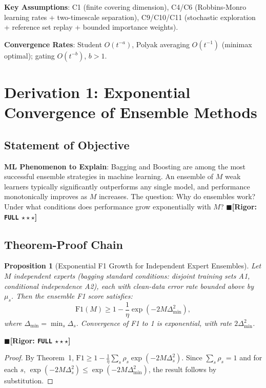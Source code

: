 \documentclass[12pt,a4paper]{article}
\newtheorem{proposition}[theorem]{Proposition}
\theoremstyle{definition}
\theoremstyle{remark}
\newcommand{\rigorFull}{$\blacksquare$\;\textbf{[Rigor: \texttt{FULL} $\star\star\star$]}}
\begin{document}
\noindent\textbf{Key Assumptions}: C1 (finite covering dimension), C4/C6 (Robbins-Monro learning rates + two-timescale separation), C9/C10/C11 (stochastic exploration + reference set replay + bounded importance weights).

\noindent\textbf{Convergence Rates}: Student $O(t^{-a})$, Polyak averaging $O(t^{-1})$ (minimax optimal); gating $O(t^{-b})$, $b > 1$.

\section{Derivation 1: Exponential Convergence of Ensemble Methods}
\label{sec:ensemble}

\subsection{Statement of Objective}
\textbf{ML Phenomenon to Explain}: Bagging and Boosting are among the most successful ensemble strategies in machine learning. An ensemble of $M$ weak learners typically significantly outperforms any single model, and performance monotonically improves as $M$ increases. The question: Why do ensembles work? Under what conditions does performance grow exponentially with $M$?
\rigorFull

\subsection{Theorem-Proof Chain}

\begin{proposition}[Exponential F1 Growth for Independent Expert Ensembles]
\label{prop:1}
Let $M$ independent experts (bagging standard conditions: disjoint training sets A1, conditional independence A2), each with clean-data error rate bounded above by $\mu_s$. Then the ensemble F1 score satisfies:
\begin{equation}
\mathrm{F1}(M) \geq 1 - \frac{1}{\eta}\exp(-2M\Delta_{\min}^2),
\end{equation}
where $\Delta_{\min} = \min_s \Delta_s$. Convergence of F1 to 1 is exponential, with rate $2\Delta_{\min}^2$.
\end{proposition}
\rigorFull

\begin{proof}
By Theorem~1, $\mathrm{F1} \geq 1 - \frac{1}{\eta}\sum_s \rho_s \exp(-2M\Delta_s^2)$. Since $\sum_s \rho_s = 1$ and for each $s$, $\exp(-2M\Delta_s^2) \leq \exp(-2M\Delta_{\min}^2)$, the result follows by substitution.
\end{proof}
\end{document}
